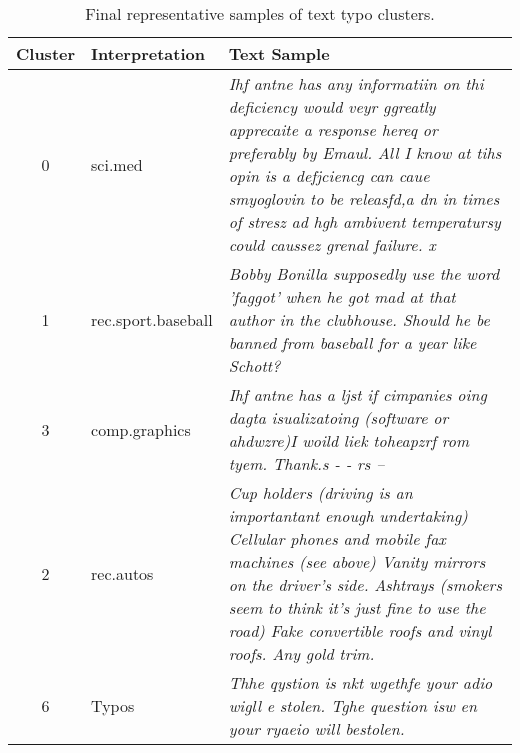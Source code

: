 \begin{table}[ht]
    \centering
    \scriptsize %
    \renewcommand{\arraystretch}{0.9} %
    \setlength{\tabcolsep}{4pt} %
    \begin{tabularx}{\linewidth}{c|l|X}
        \hline
        \textbf{Cluster} & \textbf{Interpretation} & \textbf{Text Sample} \\
        \hline
        0 & sci.med & \emph{Ihf antne has any informatiin on thi deficiency would veyr ggreatly apprecaite a response hereq or preferably by Emaul. All I know at tihs opin is a defjciencg can caue smyoglovin to be releasfd,a dn in times of stresz ad hgh ambivent temperatursy could caussez grenal failure. x} \\
        \hline
        1 & rec.sport.baseball & \emph{Bobby Bonilla supposedly use the word 'faggot' when he got mad at that author in the clubhouse. Should he be banned from baseball for a year like Schott?} \\
        \hline
        3 & comp.graphics & \emph{Ihf antne has a ljst if cimpanies oing dagta isualizatoing (software or ahdwzre)I woild liek toheapzrf rom tyem. Thank.s - - rs --} \\
        \hline
        2 & rec.autos & \emph{Cup holders (driving is an importantant enough undertaking) Cellular phones and mobile fax machines (see above) Vanity mirrors on the driver's side. Ashtrays (smokers seem to think it's just fine to use the road) Fake convertible roofs and vinyl roofs. Any gold trim.} \\
        \hline
        6 & Typos & \emph{Thhe qystion is nkt wgethfe your adio wigll e stolen. Tghe question isw en your ryaeio will bestolen.} \\
        \hline
    \end{tabularx}
    \caption{Final representative samples of text typo clusters.}
\end{table}
